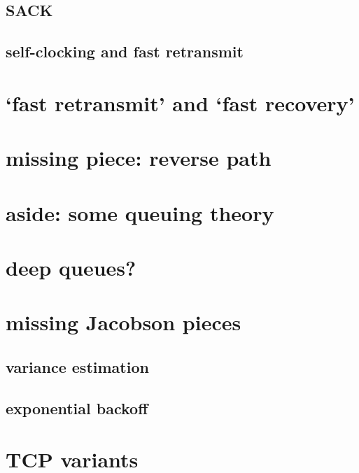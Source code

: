 \subsection{SACK}


\subsection{self-clocking and fast retransmit}




\section{`fast retransmit' and `fast recovery'}
\section{missing piece: reverse path}


\section{aside: some queuing theory}


\section{deep queues?}


\section{missing Jacobson pieces}
\subsection{variance estimation}


\subsection{exponential backoff}


\section{TCP variants}


